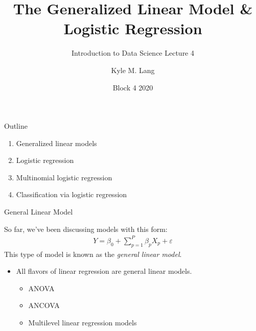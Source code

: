 \documentclass{beamer}\usepackage[]{graphicx}\usepackage[]{color}
\title{The Generalized Linear Model \& Logistic Regression}
\subtitle{Introduction to Data Science Lecture 4}
\author{Kyle M. Lang}
\institute{Department of Methodology \& Statistics\\Tilburg University}
\date{Block 4 2020}
\begin{document}

\begin{frame}[t,plain]
\titlepage
\end{frame}


\begin{frame}{Outline}
  
  \begin{enumerate}
  \item Generalized linear models
    \vb
  \item Logistic regression
    \vb
  \item Multinomial logistic regression
    \vb
  \item Classification via logistic regression
  \end{enumerate}
  
\end{frame}


\begin{frame}{General Linear Model}
  
  So far, we've been discussing models with this form:
  \begin{align*}
    Y = \beta_0 + \sum_{p = 1}^P \beta_p X_p + \varepsilon
  \end{align*}
  This type of model is known as the \emph{general linear model}.
  \vc
  \begin{itemize}
  \item All flavors of linear regression are general linear models.
    \vc
    \begin{itemize}
    \item ANOVA
    \item ANCOVA
    \item Multilevel linear regression models
    \end{itemize}
  \end{itemize}
  
\end{frame}

\end{document}
